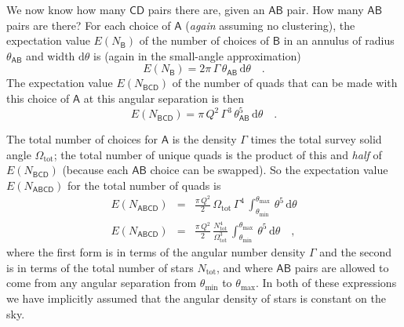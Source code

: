 \documentclass[letterpaper]{article}
\newcommand{\starlabel}[1]{\mathsf{#1}}
\newcommand{\AAA}{\starlabel{A}}
\newcommand{\BBB}{\starlabel{B}}
\newcommand{\CCC}{\starlabel{C}}
\newcommand{\DDD}{\starlabel{D}}
\newcommand{\thetaAB}{\theta_{\AAA\BBB}}
\newcommand{\dtheta}{\mathrm{d}\theta}
\newcommand{\ENB}{E(N_{\BBB})}
\newcommand{\ENBCD}{E(N_{\BBB\CCC\DDD})}
\newcommand{\ENABCD}{E(N_{\AAA\BBB\CCC\DDD})}
\newcommand{\Ntotal}{N_\mathrm{tot}}
\newcommand{\Omegatotal}{\Omega_\mathrm{tot}}
\newcommand{\thetamin}{\theta_\mathrm{min}}
\newcommand{\thetamax}{\theta_\mathrm{max}}
\begin{document}
We now know how many $\CCC\DDD$ pairs there are, given an $\AAA\BBB$
pair.  How many $\AAA\BBB$ pairs are there?  For each choice of $\AAA$
(\emph{again} assuming no clustering), the expectation value $\ENB$ of
the number of choices of $\BBB$ in an annulus of radius $\thetaAB$ and
width $\dtheta$ is (again in the small-angle approximation)
\begin{equation}
\ENB = 2\pi\,\Gamma\,\thetaAB\,\dtheta \quad .
\end{equation}
The expectation value $\ENBCD$ of the number of quads that can be made
with this choice of $\AAA$ at this angular separation is then
\begin{equation}
\ENBCD = \pi\,Q^2\,\Gamma^3\,\thetaAB^5\,\dtheta \quad .
\end{equation}

The total number of choices for $\AAA$ is the density $\Gamma$ times
the total survey solid angle $\Omegatotal$; the total number of unique
quads is the product of this and \emph{half} of $\ENBCD$ (because each
$\AAA\BBB$ choice can be swapped).  So the expectation value $\ENABCD$
for the total number of quads is
\begin{eqnarray}\displaystyle
\ENABCD & = & \frac{\pi\,Q^2}{2}\,\Omegatotal\,\Gamma^4\,
                \int_{\thetamin}^{\thetamax}\,\theta^5\,\dtheta \\
\ENABCD & = & \frac{\pi\,Q^2}{2}\,\frac{\Ntotal^4}{\Omegatotal^3}\,
                \int_{\thetamin}^{\thetamax}\,\theta^5\,\dtheta \quad ,
\end{eqnarray}
where the first form is in terms of the angular number density
$\Gamma$ and the second is in terms of the total number of stars
$\Ntotal$, and where $\AAA\BBB$ pairs are allowed to come from any
angular separation from $\thetamin$ to $\thetamax$.  In both of these
expressions we have implicitly assumed that the angular density of
stars is constant on the sky.
\end{document}
